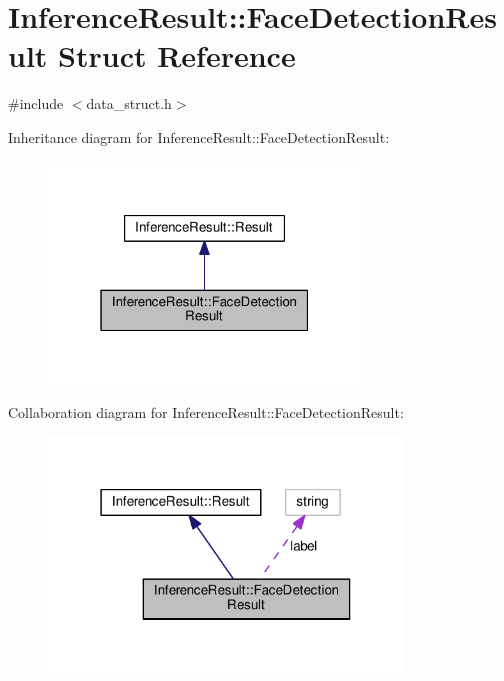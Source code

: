\hypertarget{structInferenceResult_1_1FaceDetectionResult}{}\section{Inference\+Result\+:\+:Face\+Detection\+Result Struct Reference}
\label{structInferenceResult_1_1FaceDetectionResult}


{\ttfamily \#include $<$data\+\_\+struct.\+h$>$}



Inheritance diagram for Inference\+Result\+:\+:Face\+Detection\+Result\+:
\nopagebreak
\begin{figure}[H]
\begin{center}
\leavevmode
\includegraphics[width=235pt]{structInferenceResult_1_1FaceDetectionResult__inherit__graph}
\end{center}
\end{figure}


Collaboration diagram for Inference\+Result\+:\+:Face\+Detection\+Result\+:
\nopagebreak
\begin{figure}[H]
\begin{center}
\leavevmode
\includegraphics[width=267pt]{structInferenceResult_1_1FaceDetectionResult__coll__graph}
\end{center}
\end{figure}
